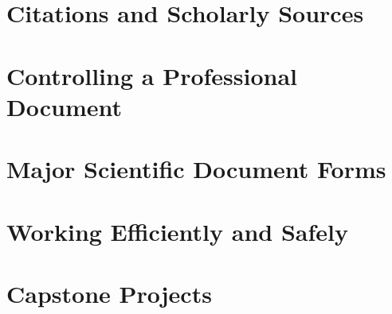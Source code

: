 \documentclass[11pt,openany]{book}
\begin{document}
\cleardoublepage
\part{Citations and Scholarly Sources}



\cleardoublepage
\part{Controlling a Professional Document}





\cleardoublepage
\part{Major Scientific Document Forms}







\cleardoublepage
\part{Working Efficiently and Safely}







\cleardoublepage
\part{Capstone Projects}



\backmatter







\printindex


\clearpage
\thispagestyle{empty}
\null
\end{document}
